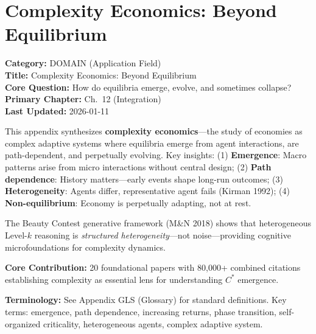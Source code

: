 \section{Complexity Economics: Beyond Equilibrium}
\label{app:complexity-economics}


\begin{tcolorbox}[colback=gray!5!white, colframe=gray!75!black,
    title=\textbf{Appendix: AG DOMAIN-COMPLEXITY}]
\textbf{Category:} DOMAIN (Application Field) \\
\textbf{Title:} Complexity Economics: Beyond Equilibrium \\
\textbf{Core Question:} How do equilibria emerge, evolve, and sometimes collapse? \\
\textbf{Primary Chapter:} Ch.\ 12 (Integration) \\
\textbf{Last Updated:} 2026-01-11
\end{tcolorbox}

\begin{tcolorbox}[colback=blue!5!white, colframe=blue!75!black,
    title=\textbf{Abstract}]

This appendix synthesizes \textbf{complexity economics}---the study of economies
as complex adaptive systems where equilibria emerge from agent interactions,
are path-dependent, and perpetually evolving. Key insights:
(1) \textbf{Emergence}: Macro patterns arise from micro interactions without central design;
(2) \textbf{Path dependence}: History matters---early events shape long-run outcomes;
(3) \textbf{Heterogeneity}: Agents differ, representative agent fails (Kirman 1992);
(4) \textbf{Non-equilibrium}: Economy is perpetually adapting, not at rest.

The Beauty Contest generative framework (M\&N 2018) shows that heterogeneous
Level-$k$ reasoning is \textit{structured heterogeneity}---not noise---providing
cognitive microfoundations for complexity dynamics.

\textbf{Core Contribution:} 20 foundational papers with 80,000+ combined citations
establishing complexity as essential lens for understanding $C^*$ emergence.

\end{tcolorbox}

\begin{tcolorbox}[colback=gray!5!white, colframe=gray!50!black]
\textbf{Terminology:} See Appendix GLS (Glossary) for standard definitions.
Key terms: emergence, path dependence, increasing returns, phase transition,
self-organized criticality, heterogeneous agents, complex adaptive system.
\end{tcolorbox}

